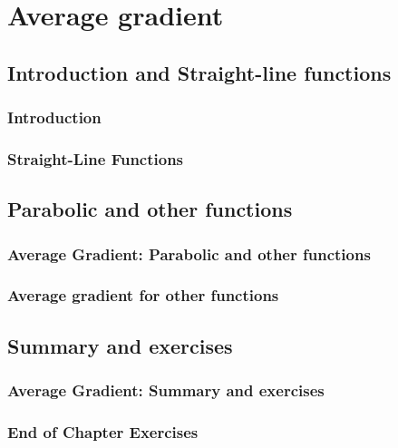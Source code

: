          \chapter{Average gradient}
         \section{ Introduction and Straight-line functions}
            \subsection{ Introduction}
            \subsection{ Straight-Line Functions}
         \section{ Parabolic and other functions}
            \subsection{ Average Gradient: Parabolic and other functions}
            \subsection{ Average gradient for other functions}
         \section{ Summary and exercises}
            \subsection{ Average Gradient: Summary and exercises}
            \subsection{ End of Chapter Exercises}
